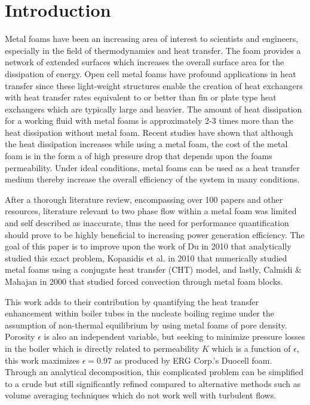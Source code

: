 \documentclass[compileTAMUreport.tex]{subfiles}
\begin{document}
\chapter{Introduction}
Metal foams have been an increasing area of interest to scientists and engineers, especially in the field of thermodynamics and heat transfer. 
The foam provides a network of extended surfaces which increases the overall surface area for the dissipation of energy. 
Open cell metal foams have profound applications in heat transfer since these light-weight structures enable the creation of heat exchangers with heat transfer rates equivalent to or better than fin or plate type heat exchangers which are typically large and heavier.
\cite{Calmidi2000}
The amount of heat dissipation for a working fluid with metal foams is approximately 2-3 times more than the heat dissipation  without metal foam.
\cite{Ken2007}
Recent studies have shown that although the heat dissipation increases while using a metal foam, the cost of the metal foam is in the form a of high pressure drop that depends upon the foams permeability.
\cite{DuPlessis1994,Xianbing2012}
Under ideal conditions, metal foams can be used as a heat transfer medium thereby increase the overall efficiency of the system in many conditions.


After a thorough literature review, encompassing over 100 papers and other resources, literature relevant to two phase flow within a metal foam was limited and self described as inaccurate, thus the need for performance quantification should prove to be highly beneficial to increasing power generation efficiency.
\cite{Zhao2009}
The goal of this paper is to improve upon the work of Du in 2010 that analytically studied this exact problem, Kopanidis et al. in 2010 that numerically studied metal foams using a conjugate heat transfer (CHT) model, and lastly, Calmidi \& Mahajan in 2000 that studied forced convection through metal foam blocks. 
\cite{Du2010,Kopanidis2010,Calmidi2000}

This work adds to their contribution by quantifying the heat transfer enhancement within boiler tubes in the nucleate boiling regime under the assumption of non-thermal equilibrium by using metal foams of pore density. Porosity $\epsilon$ is also an independent variable, but seeking to minimize pressure losses in the boiler which is directly related to permeability $K$ which is a function of $\epsilon$, this work maximizes $\epsilon = 0.97$ as produced by ERG Corp.'s Duocell foam.
Through an analytical decomposition, this complicated problem can be simplified to a crude but still significantly refined compared to alternative methods such as volume averaging techniques which do not work well with turbulent flows. %
\end{document}
